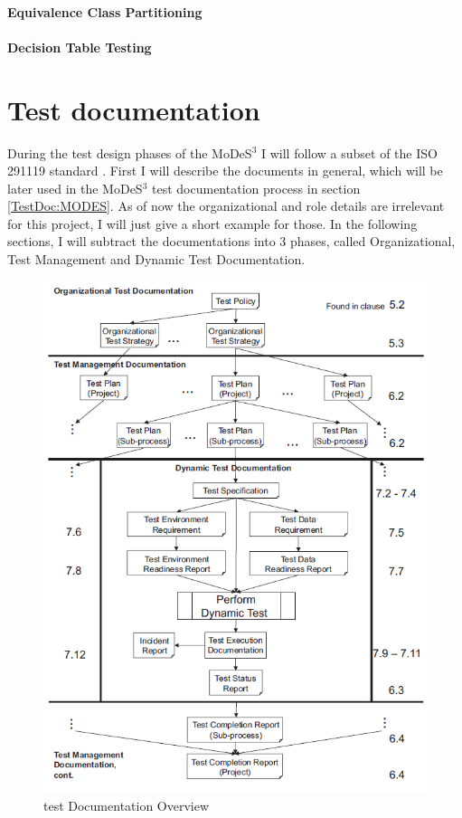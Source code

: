 \paragraph{Equivalence Class Partitioning}
\paragraph{Decision Table Testing}

\section{Test documentation}
During the test design phases of the MoDeS$^3$ I will follow a subset of the ISO 291119 standard \cite{IEEE13}.
First I will describe the documents in general, which will be later used in the MoDeS$^3$ test documentation process in section \autoref{TestDoc:MODES}. As of now the organizational and role details are irrelevant for this project, I will just give a short example for those. In the following sections, I will subtract the documentations into 3 phases, called Organizational, Test Management and Dynamic Test Documentation. 
\begin{figure}[!h]
	\centering
	\includegraphics[width=150mm, keepaspectratio]{figures/testDesign/TestDoc.png}
	\caption{test Documentation Overview}
	\label{fig:TestDocOverview}
\end{figure}

